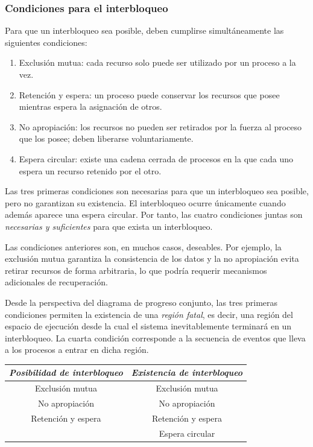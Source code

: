 \subsubsection{Condiciones para el interbloqueo}

Para que un interbloqueo sea posible, deben cumplirse simultáneamente las siguientes condiciones:
\begin{enumerate}
  \item Exclusión mutua: cada recurso solo puede ser utilizado por un proceso a la vez.
  \item Retención y espera: un proceso puede conservar los recursos que posee mientras espera la asignación de otros.
  \item No apropiación: los recursos no pueden ser retirados por la fuerza al proceso que los posee; deben liberarse voluntariamente.
  \item Espera circular: existe una cadena cerrada de procesos en la que cada uno espera un recurso retenido por el otro.
\end{enumerate}

Las tres primeras condiciones son necesarias para que un interbloqueo sea posible, pero no garantizan su existencia. El interbloqueo ocurre únicamente cuando además aparece una espera circular. Por tanto, las cuatro condiciones juntas son \textit{necesarias y suficientes} para que exista un interbloqueo.

Las condiciones anteriores son, en muchos casos, deseables. Por ejemplo, la exclusión mutua garantiza la consistencia de los datos y la no apropiación evita retirar recursos de forma arbitraria, lo que podría requerir mecanismos adicionales de recuperación.

Desde la perspectiva del diagrama de progreso conjunto, las tres primeras condiciones permiten la existencia de una \textit{región fatal}, es decir, una región del espacio de ejecución desde la cual el sistema inevitablemente terminará en un interbloqueo. La cuarta condición corresponde a la secuencia de eventos que lleva a los procesos a entrar en dicha región.

\begin{center}
\begin{tabular}{cc}
\textit{Posibilidad de interbloqueo} & \textit{Existencia de interbloqueo} \\
\hline
Exclusión mutua & Exclusión mutua \\
No apropiación & No apropiación \\
Retención y espera & Retención y espera \\
 & Espera circular 
\end{tabular}
\end{center}

